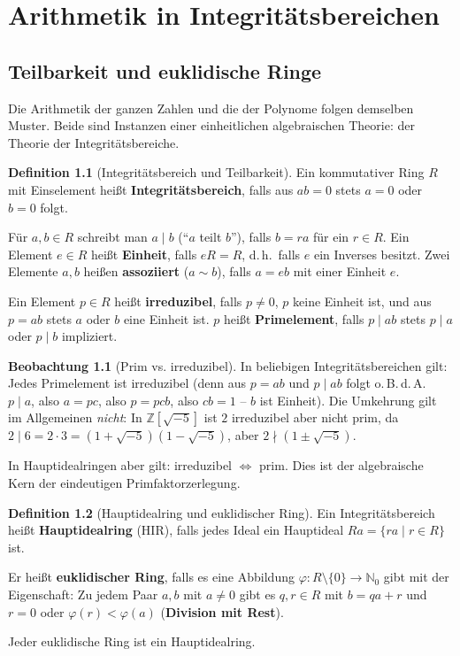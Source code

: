 ﻿\documentclass[a4paper,12pt]{report}
\theoremstyle{definition}
\newtheorem{definition}{Definition}
\newtheorem{beobachtung}{Beobachtung}
\begin{document}
\chapter{Arithmetik in Integritätsbereichen}

\section{Teilbarkeit und euklidische Ringe}

Die Arithmetik der ganzen Zahlen und die der Polynome folgen demselben
Muster. Beide sind Instanzen einer einheitlichen algebraischen Theorie:
der Theorie der Integritätsbereiche.

\begin{definition}[Integritätsbereich und Teilbarkeit]
    Ein kommutativer Ring $R$ mit Einselement heißt
    \textbf{Integritätsbereich}, falls aus $ab = 0$ stets $a = 0$
    oder $b = 0$ folgt.

    Für $a, b \in R$ schreibt man $a \mid b$ (``$a$ teilt $b$''),
    falls $b = ra$ für ein $r \in R$. Ein Element $e \in R$ heißt
    \textbf{Einheit}, falls $eR = R$, d.\,h.\ falls $e$ ein
    Inverses besitzt. Zwei Elemente $a, b$ heißen \textbf{assoziiert}
    ($a \sim b$), falls $a = eb$ mit einer Einheit $e$.

    Ein Element $p \in R$ heißt \textbf{irreduzibel}, falls $p \neq 0$,
    $p$ keine Einheit ist, und aus $p = ab$ stets $a$ oder $b$ eine
    Einheit ist. $p$ heißt \textbf{Primelement}, falls $p \mid ab$
    stets $p \mid a$ oder $p \mid b$ impliziert.
\end{definition}

\begin{beobachtung}[Prim vs. irreduzibel]
    In beliebigen Integritätsbereichen gilt: Jedes Primelement ist
    irreduzibel (denn aus $p = ab$ und $p \mid ab$ folgt o.\,B.\,d.\,A.\
    $p \mid a$, also $a = pc$, also $p = pcb$, also $cb = 1$ -- $b$ ist Einheit).
    Die Umkehrung gilt im Allgemeinen \emph{nicht}: In
    $\mathbb{Z}[\sqrt{-5}]$ ist $2$ irreduzibel aber nicht prim, da
    $2 \mid 6 = 2 \cdot 3 = (1 + \sqrt{-5})(1 - \sqrt{-5})$, aber
    $2 \nmid (1 \pm \sqrt{-5})$.

    In Hauptidealringen aber gilt: irreduzibel $\Leftrightarrow$ prim.
    Dies ist der algebraische Kern der eindeutigen Primfaktorzerlegung.
\end{beobachtung}

\begin{definition}[Hauptidealring und euklidischer Ring]
    Ein Integritätsbereich heißt \textbf{Hauptidealring} (HIR), falls jedes
    Ideal ein Hauptideal $Ra = \{ra \mid r \in R\}$ ist.

    Er heißt \textbf{euklidischer Ring}, falls es eine Abbildung
    $\varphi : R \setminus \{0\} \to \mathbb{N}_0$ gibt mit der
    Eigenschaft: Zu jedem Paar $a, b$ mit $a \neq 0$ gibt es $q, r \in R$
    mit $b = qa + r$ und $r = 0$ oder $\varphi(r) < \varphi(a)$
    (\textbf{Division mit Rest}).

    Jeder euklidische Ring ist ein Hauptidealring.
\end{definition}
\end{document}
